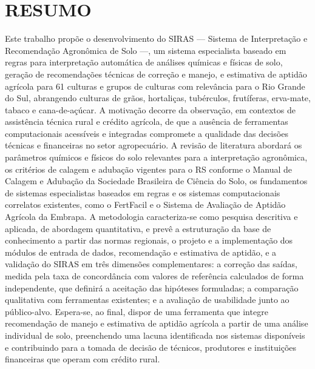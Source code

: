 \chapter{RESUMO}\label{chap:resumo}

Este trabalho propõe o desenvolvimento do SIRAS --- Sistema de Interpretação
e Recomendação Agronômica de Solo ---, um sistema especialista baseado em
regras para interpretação automática de análises químicas e físicas de solo,
geração de recomendações técnicas de correção e manejo, e estimativa de aptidão
agrícola para 61 culturas e grupos de culturas com relevância para o Rio Grande do Sul, abrangendo
culturas de grãos, hortaliças, tubérculos, frutíferas, erva-mate, tabaco e cana-de-açúcar.
A motivação decorre da observação, em contextos de assistência técnica rural e
crédito agrícola, de que a ausência de ferramentas computacionais acessíveis e
integradas compromete a qualidade das decisões técnicas e financeiras no setor
agropecuário. A revisão de literatura abordará os parâmetros químicos e físicos
do solo relevantes para a interpretação agronômica, os critérios de calagem e
adubação vigentes para o RS conforme o Manual de Calagem e Adubação da Sociedade
Brasileira de Ciência do Solo, os fundamentos de sistemas especialistas baseados
em regras e os sistemas computacionais correlatos existentes, como o FertFacil e
o Sistema de Avaliação de Aptidão Agrícola da Embrapa. A metodologia
caracteriza-se como pesquisa descritiva e aplicada, de abordagem quantitativa,
e prevê a estruturação da base de conhecimento a partir das normas regionais,
o projeto e a implementação dos módulos de entrada de dados, recomendação e
estimativa de aptidão, e a validação do SIRAS em três dimensões complementares:
a correção das saídas, medida pela taxa de concordância com valores de
referência calculados de forma independente, que definirá a aceitação das
hipóteses formuladas; a comparação qualitativa com ferramentas existentes; e a
avaliação de usabilidade junto ao público-alvo. Espera-se, ao final, dispor de uma ferramenta que integre recomendação
de manejo e estimativa de aptidão agrícola a partir de uma análise individual de
solo, preenchendo uma lacuna identificada nos sistemas disponíveis e contribuindo
para a tomada de decisão de técnicos, produtores e instituições financeiras que
operam com crédito rural.
